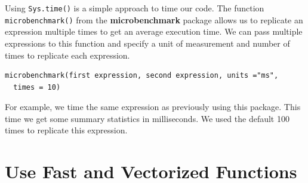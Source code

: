 \documentclass[
  letterpaper,
]{latex/krantz}
\makeatletter
\newenvironment{Shaded}{\begin{snugshade}}{\end{snugshade}}
\newcommand{\AttributeTok}[1]{\textcolor[rgb]{0.40,0.45,0.13}{#1}}
\newcommand{\CommentTok}[1]{\textcolor[rgb]{0.37,0.37,0.37}{#1}}
\newcommand{\ControlFlowTok}[1]{\textcolor[rgb]{0.00,0.23,0.31}{#1}}
\newcommand{\DecValTok}[1]{\textcolor[rgb]{0.68,0.00,0.00}{#1}}
\newcommand{\FunctionTok}[1]{\textcolor[rgb]{0.28,0.35,0.67}{#1}}
\newcommand{\NormalTok}[1]{\textcolor[rgb]{0.00,0.23,0.31}{#1}}
\newcommand{\OtherTok}[1]{\textcolor[rgb]{0.00,0.23,0.31}{#1}}
\newcommand{\SpecialCharTok}[1]{\textcolor[rgb]{0.37,0.37,0.37}{#1}}
\newcommand{\StringTok}[1]{\textcolor[rgb]{0.13,0.47,0.30}{#1}}
\newenvironment{kframe}{%
\medskip{}
\setlength{\fboxsep}{.8em}
 \def\at@end@of@kframe{}%
 \ifinner\ifhmode%
  \def\at@end@of@kframe{\end{minipage}}%
  \begin{minipage}{\columnwidth}%
 \fi\fi%
 \def\FrameCommand##1{\hskip\@totalleftmargin \hskip-\fboxsep
 \colorbox{shadecolor}{##1}\hskip-\fboxsep
     \hskip-\linewidth \hskip-\@totalleftmargin \hskip\columnwidth}%
 \MakeFramed {\advance\hsize-\width
   \@totalleftmargin\z@ \linewidth\hsize
   \@setminipage}}%
 {\par\unskip\endMakeFramed%
 \at@end@of@kframe}
\renewenvironment{Shaded}{\begin{kframe}}{\end{kframe}}
\makeatother
\begin{document}
Using \texttt{Sys.time()} is a simple approach to time our code. The
function
\texttt{microbenchmark()}
from the \textbf{microbenchmark} package allows us to replicate an
expression multiple times to get an average execution time. We can pass
multiple expressions to this function and specify a unit of measurement
and number of times to replicate each expression.

\begin{verbatim}
microbenchmark(first expression, second expression, units ="ms", 
  times = 10)
\end{verbatim}

For example, we time the same expression as previously using this
package. This time we get some summary statistics in milliseconds. We
used the default 100 times to replicate this expression.

\begin{Shaded}
\end{Shaded}

\section{\texorpdfstring{Use Fast and Vectorized Functions
}{Use Fast and Vectorized Functions }}\label{use-fast-and-vectorized-functions}
\end{document}
